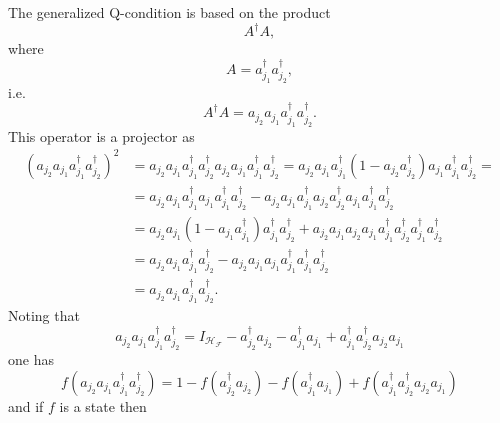 \documentclass[aps,preprint]{revtex4}%
\begin{document}
The generalized Q-condition is based on the product
\begin{equation}
A^{\dagger}A,
\end{equation}
where
\begin{equation}
A=a_{j_{1}}^{\dagger}a_{j_{2}}^{\dagger},
\end{equation}
i.e.%
\begin{equation}
A^{\dagger}A=a_{j_{2}}a_{j_{1}}a_{j_{1}}^{\dagger}a_{j_{2}}^{\dagger}.
\end{equation}
This operator is a projector as
\begin{align}
\left(  a_{j_{2}}a_{j_{1}}a_{j_{1}}^{\dagger}a_{j_{2}}^{\dagger}\right)  ^{2}
&  =a_{j_{2}}a_{j_{1}}a_{j_{1}}^{\dagger}a_{j_{2}}^{\dagger}a_{j_{2}}a_{j_{1}%
}a_{j_{1}}^{\dagger}a_{j_{2}}^{\dagger}=a_{j_{2}}a_{j_{1}}a_{j_{1}}^{\dagger
}\left(  1-a_{j_{2}}a_{j_{2}}^{\dagger}\right)  a_{j_{1}}a_{j_{1}}^{\dagger
}a_{j_{2}}^{\dagger}=\nonumber\\
&  =a_{j_{2}}a_{j_{1}}a_{j_{1}}^{\dagger}a_{j_{1}}a_{j_{1}}^{\dagger}a_{j_{2}%
}^{\dagger}-a_{j_{2}}a_{j_{1}}a_{j_{1}}^{\dagger}a_{j_{2}}a_{j_{2}}^{\dagger
}a_{j_{1}}a_{j_{1}}^{\dagger}a_{j_{2}}^{\dagger}\nonumber\\
&  =a_{j_{2}}a_{j_{1}}\left(  1-a_{j_{1}}a_{j_{1}}^{\dagger}\right)  a_{j_{1}%
}^{\dagger}a_{j_{2}}^{\dagger}+a_{j_{2}}a_{j_{1}}a_{j_{2}}a_{j_{1}}a_{j_{1}%
}^{\dagger}a_{j_{2}}^{\dagger}a_{j_{1}}^{\dagger}a_{j_{2}}^{\dagger
}\nonumber\\
&  =a_{j_{2}}a_{j_{1}}a_{j_{1}}^{\dagger}a_{j_{2}}^{\dagger}-a_{j_{2}}%
a_{j_{1}}a_{j_{1}}a_{j_{1}}^{\dagger}a_{j_{1}}^{\dagger}a_{j_{2}}^{\dagger
}\nonumber\\
&  =a_{j_{2}}a_{j_{1}}a_{j_{1}}^{\dagger}a_{j_{2}}^{\dagger}.
\end{align}
Noting that
\begin{equation}
a_{j_{2}}a_{j_{1}}a_{j_{1}}^{\dagger}a_{j_{2}}^{\dagger}=I_{\mathcal{H}%
_{\mathcal{F}}}-a_{j_{2}}^{\dagger}a_{j_{2}}-a_{j_{1}}^{\dagger}a_{j_{1}%
}+a_{j_{1}}^{\dagger}a_{j_{2}}^{\dagger}a_{j_{2}}a_{j_{1}}%
\end{equation}
one has
\begin{equation}
f\left(  a_{j_{2}}a_{j_{1}}a_{j_{1}}^{\dagger}a_{j_{2}}^{\dagger}\right)
=1-f\left(  a_{j_{2}}^{\dagger}a_{j_{2}}\right)  -f\left(  a_{j_{1}}^{\dagger
}a_{j_{1}}\right)  +f\left(  a_{j_{1}}^{\dagger}a_{j_{2}}^{\dagger}a_{j_{2}%
}a_{j_{1}}\right)
\end{equation}
and if $f$ is a state then
\end{document}
